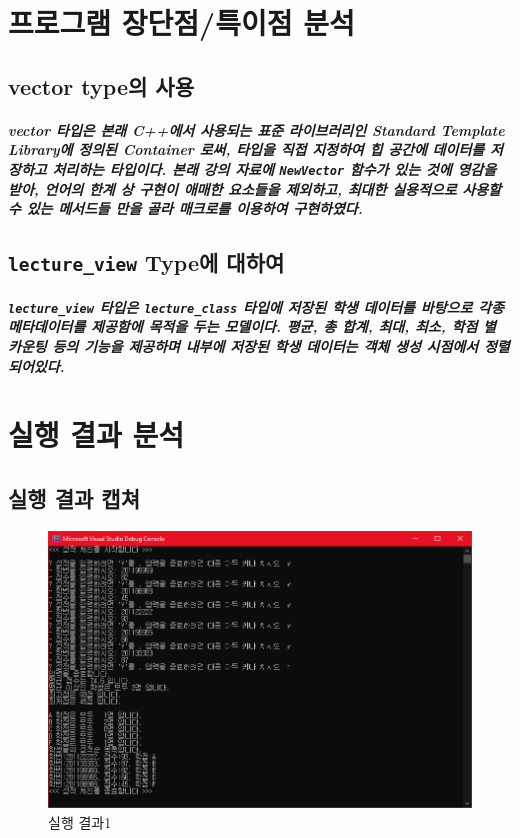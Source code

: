 \documentclass[UTF8]{report}
\begin{document}
    \chapter{프로그램 장단점/특이점 분석}
            \section{vector type의 사용}
            \paragraph{%
                \normalfont vector 타입은 본래 C++에서 사용되는 표준 라이브러리인 Standard Template Library에 정의된 Container 로써, 타입을 직접 지정하여 힙 공간에 데이터를 저장하고 처리하는 타입이다. 본래 강의 자료에 \texttt{NewVector} 함수가 있는 것에 영감을 받아, 언어의 한계 상 구현이 애매한 요소들을 제외하고, 최대한 실용적으로 사용할 수 있는 메서드들 만을 골라 매크로를 이용하여 구현하였다.
            }   

            \section{\texttt{lecture\_view} Type에 대하여}
            \paragraph{%
                \normalfont \texttt{lecture\_view} 타입은 \texttt{lecture\_class} 타입에 저장된 학생 데이터를 바탕으로 각종 메타데이터를 제공함에 목적을 두는 모델이다. 평균, 총 합계, 최대, 최소, 학점 별 카운팅 등의 기능을 제공하며 내부에 저장된 학생 데이터는 객체 생성 시점에서 정렬되어있다.
            }

    \chapter{실행 결과 분석}
        \section{실행 결과 캡쳐}
        \begin{figure}[!htb]
            \centering
            \includegraphics[width=\textwidth]{output_1.png}
            \caption{실행 결과1}
        \end{figure}
        
\end{document}
